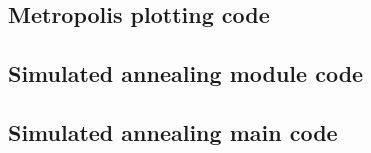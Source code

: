 \documentclass[twocolumn]{myarticle}
\begin{document}
\subsection{Metropolis plotting code}
\label{subsec:metropolis_plotting_code}


\vspace{10pt}

\subsection{Simulated annealing module code}
\label{subsec:simulated_annealing_module_code}


\vspace{10pt}

\subsection{Simulated annealing main code}
\label{subsec:simulated_annealing_main_code}


\vspace{10pt}
\end{document}
